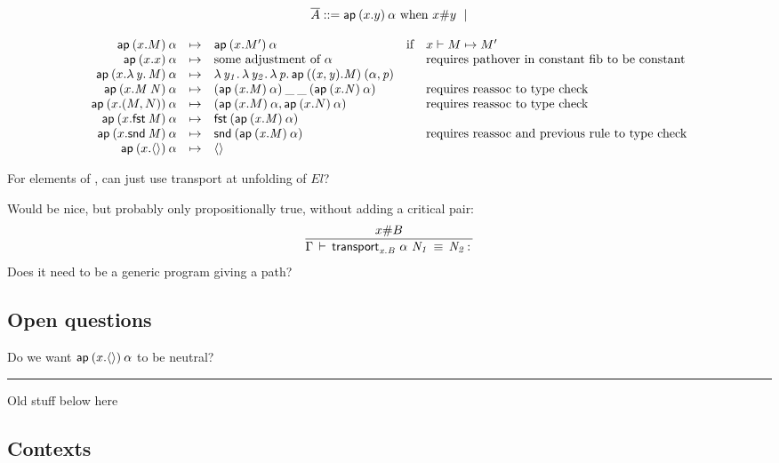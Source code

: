 \begin{small}
\[
\begin{array}{l}
\overline{A} ::= \mathsf{ap} \: {(x.y)} \: {\alpha} \text{ when $x \# y$ } \mid \\
\end{array}
\]
\end{small}

\begin{small}
\[
\begin{array}{rclll}
\mathsf{ap} \: {(x.M)} \: {\alpha} & \mapsto & \mathsf{ap} \: {(x.M')} \: {\alpha} & \text{if} & x \vdash M \mapsto M'\\ 
\mathsf{ap} \: {(x.x)} \: {\alpha} & \mapsto & \text{some adjustment of $\alpha$} & & \text{requires pathover in constant fib to be constant}\\ 
\mathsf{ap} \: {(x.\mathit{\lambda\,y.\,M})} \: {\alpha} & \mapsto & \mathit{\lambda\,y_1.\,\mathit{\lambda\,y_2.\,\mathit{\lambda\,p.\,\mathsf{ap} \: {((x,y).M)} \: {(\alpha,p)}}}}\\
\mathsf{ap} \: {(x.\mathit{M \: N})} \: {\alpha} & \mapsto & \mathit{(\mathsf{ap} \: {(x.M)} \: {\alpha}) \: \_ \: \_ \: (\mathsf{ap} \: {(x.N)} \: {\alpha})} & &\text{requires reassoc to type check}\\ 
\mathsf{ap} \: {(x.(M,N))} \: {\alpha} & \mapsto & (\mathsf{ap} \: {(x.M)} \: {\alpha}, \mathsf{ap} \: {(x.N)} \: {\alpha}) & & \text{requires reassoc to type check}\\ 
\mathsf{ap} \: {(x.\mathit{\mathsf{fst} \: M})} \: {\alpha} & \mapsto & \mathit{\mathsf{fst} \: (\mathsf{ap} \: {(x.M)} \: {\alpha})} & & \\ 
\mathsf{ap} \: {(x.\mathit{\mathsf{snd} \: M})} \: {\alpha} & \mapsto & \mathit{\mathsf{snd} \: (\mathsf{ap} \: {(x.M)} \: {\alpha})} & & \text{requires reassoc and previous rule to type check}\\ 
\mathsf{ap} \: {(x.\mathsf{\langle\rangle})} \: {\alpha} & \mapsto & \mathsf{\langle\rangle} & \\ 
\end{array}
\]
\end{small}

For elements of \set, can just use transport at unfolding of $El$?  

Would be nice, but probably only propositionally true, without adding a
critical pair:
\[
\infer{\deqtm{\Gamma}{\transport{x.B}{\alpha}{N_1}}{N_2}{}}
      {x \# B}
\]
Does it need to be a generic program giving a path?

\subsection{Open questions}

Do we want $\mathsf{ap} \: {(x.\mathsf{\langle\rangle})} \: {\alpha}$ to be neutral?

\bigskip
\hrule
\bigskip

Old stuff below here

\subsection{Contexts}


